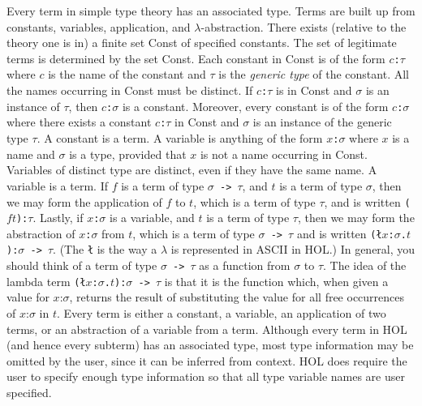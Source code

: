 Every term in simple type theory has an associated type.  Terms are
built up from constants, variables, application, and
$\lambda$-abstraction.  There exists (relative to the theory one is
in) a finite set {\sf Const} of specified constants.  The set of
legitimate terms is determined by the set {\sf Const}.  Each constant
in {\sf Const} is of the form {\tt $c$:$\tau$} where $c$ is the name
of the constant and $\tau$ is the {\it generic type} of the constant.
All the names occurring in {\sf Const} must be distinct.  If
{\tt $c$:$\tau$} is in {\sf Const} and $\sigma$ is an instance of
$\tau$, then {\tt $c$:$\sigma$} is a constant.  Moreover, every
constant is of the form {\tt $c$:$\sigma$} where there exists a
constant {\tt $c$:$\tau$} in {\sf Const} and $\sigma$ is an instance
of the generic type $\tau$.  A constant is a term.  A variable is
anything of the form {\tt $x$:$\sigma$} where $x$ is a name and
$\sigma$ is a type, provided that $x$ is not a name occurring in
{\sf Const}.  Variables of distinct type are distinct, even if they
have the same name.  A variable is a term.  If $f$ is a term of type
{\tt $\sigma$ -> $\tau$}, and $t$ is a term of type $\sigma$, then we
may form the application of $f$ to $t$, which is a term of type $\tau$,
and is written \mbox{\tt ($ft$):$\tau$}.  Lastly, if {\tt$x$:$\sigma$}
is a variable, and $t$ is a term of type $\tau$, then we may form the
abstraction of \mbox{\tt $x$:$\sigma$} from $t$, which is a term of
type \mbox{\tt $\sigma$ -> $\tau$} and is written
\mbox{\tt (\l$x$:$\sigma$.$t$):$\sigma$ -> $\tau$}.  (The {\tt \l} is
the way a $\lambda$ is represented in ASCII in HOL.)  In general, you
should think of a term of type \mbox{\tt $\sigma$ -> $\tau$} as a
function from $\sigma$ to $\tau$.  The idea of the lambda term
\mbox{\tt (\l$x$:$\sigma$.$t$):$\sigma$ -> $\tau$} is that it is the
function which, when given a value for \mbox{$x$:$\sigma$}, returns
the result of substituting the value for all free occurrences of
\mbox{$x$:$\sigma$} in $t$.   Every term is either a constant, a
variable, an application of two terms, or an abstraction of a variable
from a term.  Although every term in HOL (and hence every subterm) has
an associated type, most type information may be omitted by the user,
since it can be inferred from context.  HOL does require the user to
specify enough type information so that all type variable names are
user specified.

